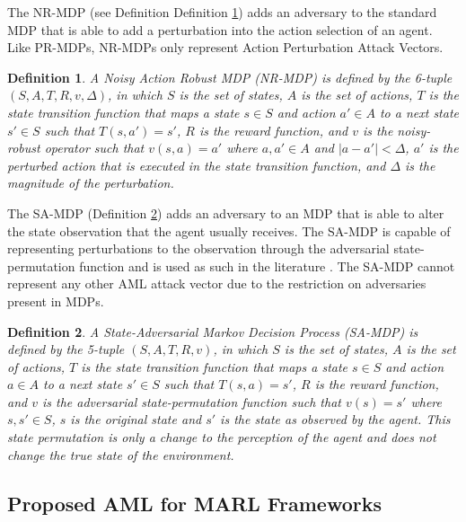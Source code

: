 \documentclass[conference,compsoc]{IEEEtran}
\newtheorem{definition}{Definition}
\begin{document}
The NR-MDP \cite{tessler_action_2019} (see Definition Definition \ref{def:nr_mdp}) adds an adversary to the standard MDP that is able to add a perturbation into the action selection of an agent. Like PR-MDPs, NR-MDPs only represent Action Perturbation Attack Vectors.

\begin{definition}
A Noisy Action Robust MDP (NR-MDP) is defined by the 6-tuple $(S, A, T, R, v, \Delta)$, in which $S$ is the set of states, $A$ is the set of actions, $T$ is the state transition function that maps a state $s \in S$ and action $a' \in A$ to a next state $s' \in S$ such that $T(s, a') = s'$, $R$ is the reward function, and $v$ is the noisy-robust operator such that $v(s, a) = a'$ where $a, a' \in A$ and $|a - a'| < \Delta$, $a'$ is the perturbed action that is executed in the state transition function, and $\Delta$ is the magnitude of the perturbation.
\label{def:nr_mdp}
\end{definition}

The SA-MDP \cite{zhang_robust_2020-1} (Definition \ref{def:sa_mdp}) adds an adversary to an MDP that is able to alter the state observation that the agent usually receives. The SA-MDP is capable of representing perturbations to the observation through the adversarial state-permutation function and is used as such in the literature \cite{korkmaz_adversarial_2021,korkmaz_assessing_2021,korkmaz_investigating_2021,korkmaz_non-robust_2021,tekgul_real-time_2022,zhang_robust_2020-1,qiaoben_understanding_2021}. The SA-MDP cannot represent any other AML attack vector due to the restriction on adversaries present in MDPs.

\begin{definition}
A State-Adversarial Markov Decision Process (SA-MDP) is defined by the 5-tuple $(S, A, T, R, v)$, in which $S$ is the set of states, $A$ is the set of actions, $T$ is the state transition function that maps a state $s \in S$ and action $a \in A$ to a next state $s' \in S$ such that $T(s, a) = s'$, $R$ is the reward function, and $v$ is the adversarial state-permutation function such that $v(s) = s'$ where $s, s' \in S$, $s$ is the original state and $s'$ is the state as observed by the agent. This state permutation is only a change to the perception of the agent and does not change the true state of the environment.
\label{def:sa_mdp}
\end{definition}

\subsection{Proposed AML for MARL Frameworks}
\end{document}
